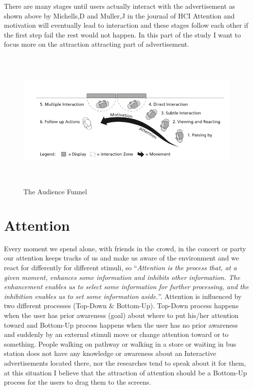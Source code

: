 \newpage
There are many stages until users actually interact with the advertisement as shown above by Michells,D and Muller,J in the journal of HCI \cite{AudienceFunnel} Attention and motivation will eventually lead to interaction and these stages follow each other if the first step fail the rest would not happen. In this part of the study I want to focus more on the attraction attracting part of advertisement.

\begin{figure}[htp]
\centering
\includegraphics[width=120mm,height=70mm]{Figures/3/TheAudienceFunnel}
\caption{The Audience Funnel}
\label{fig:audience_funnel}
\end{figure}


\section{Attention}
Every moment we spend alone, with friends in the crowd, in the concert or party our attention keeps tracks of us and make us aware of the environment and we react for differently for different stimuli, so ``\emph{Attention is the process that, at a given moment, enhances some information and inhibits other information. The enhancement enables us to select some information for further processing, and the inhibition enables us to set some information aside.}''\cite{Attention}. Attention is influenced by two different processes (Top-Down \& Bottom-Up). Top-Down process happens when the user has prior awareness (goal) about where to put his/her attention toward and Bottom-Up process happens when the user has no prior awareness and suddenly by an external stimuli move or change attention toward or to something. People walking on pathway or walking in a store or waiting in bus station does not have any knowledge or awareness about an Interactive advertisements located there, nor the researches tend to speak about it for them, at this situation I believe that the attraction of attention should be a Bottom-Up process for the users to drag them to the screens.

